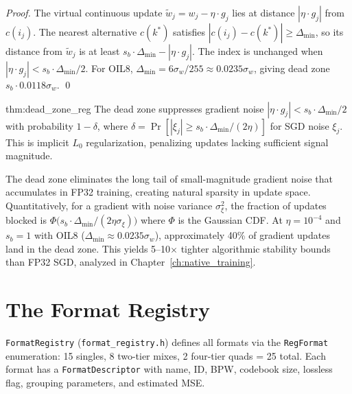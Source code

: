 \begin{proof}
The virtual continuous update $\tilde{w}_j = w_j - \eta \cdot g_j$ lies
at distance $|\eta \cdot g_j|$ from $c(i_j)$. The nearest alternative
$c(k^*)$ satisfies $|c(i_j) - c(k^*)| \geq \Delta_{\min}$, so its
distance from $\tilde{w}_j$ is at least
$s_b \cdot \Delta_{\min} - |\eta \cdot g_j|$. The index is unchanged
when $|\eta \cdot g_j| < s_b \cdot \Delta_{\min} / 2$. For OIL8,
$\Delta_{\min} = 6\sigma_w / 255 \approx 0.0235\sigma_w$, giving
dead zone $s_b \cdot 0.0118\sigma_w$. \qed
\end{proof}

\begin{mythm}{thm:dead_zone_reg}
The dead zone suppresses gradient noise
$|\eta \cdot g_j| < s_b \cdot \Delta_{\min} / 2$ with probability
$1 - \delta$, where $\delta = \Pr[|\xi_j| \geq
s_b \cdot \Delta_{\min} / (2\eta)]$ for SGD noise $\xi_j$. This is
implicit $L_0$ regularization, penalizing updates lacking sufficient
signal magnitude.
\end{mythm}

The dead zone eliminates the long tail of small-magnitude gradient
noise that accumulates in FP32 training, creating natural sparsity in
update space. Quantitatively, for a gradient with noise variance
$\sigma_\xi^2$, the fraction of updates blocked is
$\Phi\bigl(s_b \cdot \Delta_{\min} / (2\eta\sigma_\xi)\bigr)$ where
$\Phi$ is the Gaussian CDF. At $\eta = 10^{-4}$ and $s_b = 1$ with
OIL8 ($\Delta_{\min} \approx 0.0235\sigma_w$), approximately 40\% of
gradient updates land in the dead zone. This yields 5--10$\times$
tighter algorithmic stability bounds than FP32 SGD, analyzed in
Chapter~\ref{ch:native_training}.

\section{The Format Registry}
\label{sec:format_registry}

\texttt{FormatRegistry} (\texttt{format\_registry.h}) defines all
formats via the \texttt{RegFormat} enumeration: 15 singles, 8 two-tier
mixes, 2 four-tier quads = 25 total. Each format has a
\texttt{FormatDescriptor} with name, ID, BPW, codebook size, lossless
flag, grouping parameters, and estimated MSE.


